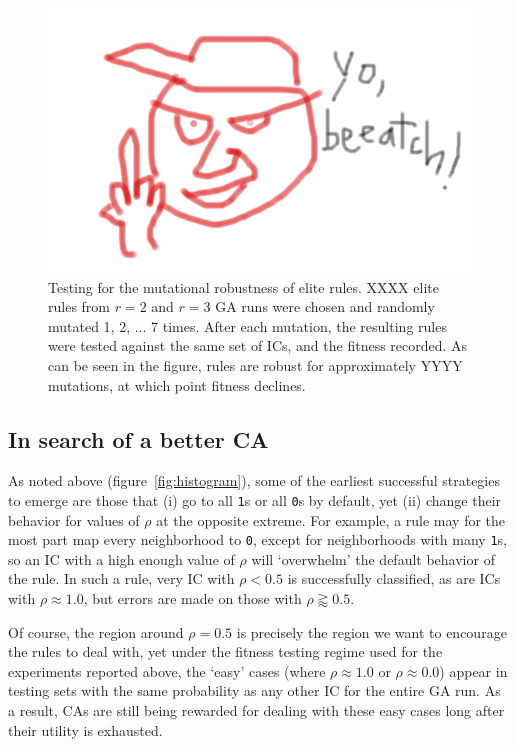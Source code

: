 \begin{figure}
\begin{center}
\includegraphics[width=\linewidth]{foo.png}
\caption{Testing for the mutational robustness of elite rules. XXXX elite rules from $r = 2$ and $r = 3$ GA runs were chosen and randomly mutated 1, 2, ... 7 
times. After each mutation, the resulting rules were tested against the same set of ICs, and the fitness recorded. As can be seen in the figure, 
rules are robust for approximately YYYY mutations, at which point fitness declines.}
\label{fig:robustness}
\end{center}
\end{figure}

\subsection{In search of a better CA} \label{sec:2_3}

As noted above (figure~\ref{fig:histogram}), some of the earliest successful strategies to emerge are those that (i) go to all \texttt{1}s or all \texttt{0}s by default, 
yet (ii) change their behavior for values of $\rho$ at the opposite extreme. For example, a rule may for the most part map every 
neighborhood to \texttt{0}, except for neighborhoods with many \texttt{1}s, so an IC with a high enough value of $\rho$ will 
`overwhelm' the default behavior of the rule. In such a rule, very IC with $\rho < 0.5$ is successfully classified, as are ICs with $\rho \approx 1.0$, but 
errors are made on those with $\rho \gtrapprox 0.5$.

Of course, the region around $\rho = 0.5$ is precisely the region we want to encourage the rules to deal with, yet under the fitness testing regime 
used for the experiments reported above, the `easy' cases (where $\rho \approx 1.0$ or $\rho \approx 0.0$) appear in testing sets  
with the same probability as any other IC for the entire GA run. As a result, CAs are still being rewarded for dealing with these easy cases long after their 
utility is exhausted.

